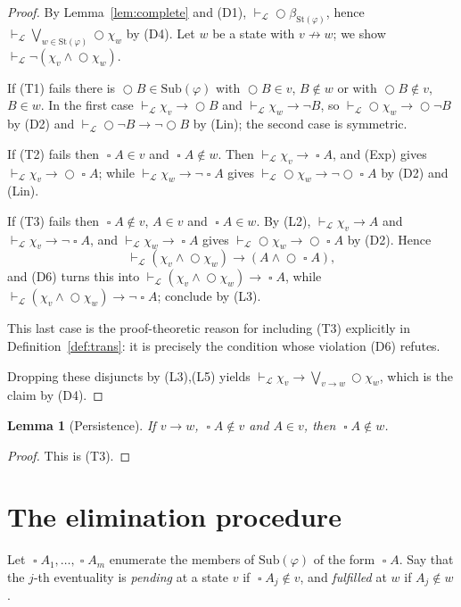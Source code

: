 \documentclass[11pt,a4paper]{article}
\newtheorem{lemma}[theorem]{Lemma}
\theoremstyle{definition}
\newcommand{\Next}{\mathop{\bigcirc}}
\newcommand{\Always}{\mathop{\square}}
\newcommand{\Sub}{\mathrm{Sub}}
\newcommand{\St}{\mathrm{St}}
\newcommand{\proves}{\vdash_{\mathcal{L}}}
\begin{document}
\begin{proof}
By Lemma~\ref{lem:complete} and (D1), $\proves\Next\beta_{\St(\varphi)}$, hence
$\proves\bigvee_{w\in\St(\varphi)}\Next\chi_w$ by (D4).  Let $w$ be a state with
$v\not\to w$; we show $\proves\neg(\chi_v\wedge\Next\chi_w)$.

If (T1) fails there is $\Next B\in\Sub(\varphi)$ with $\Next B\in v$, $B\notin w$
or with $\Next B\notin v$, $B\in w$.  In the first case
$\proves\chi_v\to\Next B$ and $\proves\chi_w\to\neg B$, so
$\proves\Next\chi_w\to\Next\neg B$ by (D2) and $\proves\Next\neg B\to\neg\Next B$
by (Lin); the second case is symmetric.

If (T2) fails then $\Always A\in v$ and $\Always A\notin w$.  Then
$\proves\chi_v\to\Always A$, and (Exp) gives $\proves\chi_v\to\Next\Always A$;
while $\proves\chi_w\to\neg\Always A$ gives
$\proves\Next\chi_w\to\neg\Next\Always A$ by (D2) and (Lin).

If (T3) fails then $\Always A\notin v$, $A\in v$ and $\Always A\in w$.  By (L2),
$\proves\chi_v\to A$ and $\proves\chi_v\to\neg\Always A$, and
$\proves\chi_w\to\Always A$ gives $\proves\Next\chi_w\to\Next\Always A$ by (D2).
Hence
\[
  \proves(\chi_v\wedge\Next\chi_w)\to(A\wedge\Next\Always A),
\]
and (D6) turns this into
$\proves(\chi_v\wedge\Next\chi_w)\to\Always A$, while
$\proves(\chi_v\wedge\Next\chi_w)\to\neg\Always A$; conclude by (L3).

This last case is the proof-theoretic reason for including (T3) explicitly in
Definition~\ref{def:trans}: it is precisely the condition whose violation (D6)
refutes.

Dropping these disjuncts by (L3),(L5) yields
$\proves\chi_v\to\bigvee_{v\to w}\Next\chi_w$, which is the claim by (D4).
\end{proof}

\begin{lemma}[Persistence]\label{lem:persist}
If $v\to w$, $\Always A\notin v$ and $A\in v$, then $\Always A\notin w$.
\end{lemma}

\begin{proof}
This is (T3).
\end{proof}

\section{The elimination procedure}

Let $\Always A_1,\dots,\Always A_m$ enumerate the members of $\Sub(\varphi)$ of
the form $\Always A$.  Say that the $j$-th eventuality is \emph{pending} at a
state $v$ if $\Always A_j\notin v$, and \emph{fulfilled} at $w$ if
$A_j\notin w$.
\end{document}
